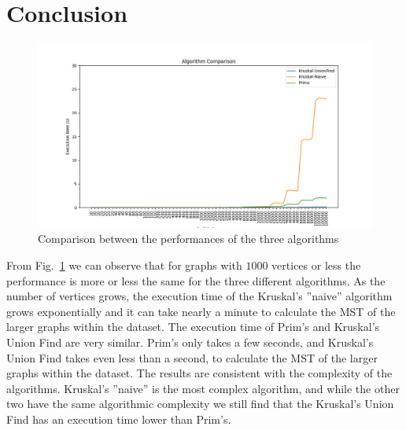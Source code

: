 \section{Conclusion}

\begin{figure}[H]
	\hspace{-1cm}\includegraphics[width=19cm]{Img/AlgorithmComparison_Graph.png}
	\caption{Comparison between the performances of the three algorithms }
	\label{comparison}
\end{figure}

From Fig.~\ref{comparison} we can observe that for graphs with $1000$ vertices or less the performance is more or less the same for the three different algorithms.
As the number of vertices grows, the execution time of the Kruskal's ''naive'' algorithm grows exponentially and it can take nearly a minute to calculate the MST of the larger graphs within the dataset.
The execution time of Prim's and Kruskal's Union Find are very similar.
Prim's only takes a few seconds, and Kruskal's Union Find takes even less than a second, to calculate the MST of the larger graphs within the dataset. 
The results are consistent with the complexity of the algorithms.
Kruskal's ''naive'' is the most complex algorithm, and while the other two have the same algorithmic complexity we still find that the Kruskal's Union Find has an execution time lower than Prim's.


\pagebreak